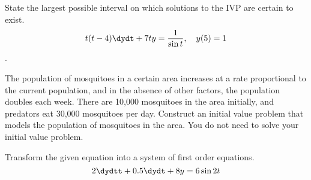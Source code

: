 \documentclass[12pt]{exam}
\begin{document}
\begin{questions}
    
    \newpage    
    
    \question[2] %
    State the largest possible interval on which solutions to the IVP are certain to exist. $$t(t-4) \dydt + 7t y = \frac{1}{\sin t}, \quad y(5) = 1$$.
    \vspace{3cm}
    
    \question[3] %
    The population of mosquitoes in a certain area increases at a rate proportional to the current population, and in the absence of other factors, the population doubles each week. There are 10,000 mosquitoes in the area initially, and predators eat 30,000 mosquitoes per day. Construct an initial value problem that models the population of mosquitoes in the area. You do not need to solve your initial value problem. 
    
    \vspace{3cm}    
    \question[3] %
    Transform the given equation into a system of first order equations. 
    $$2\dydtt + 0.5 \dydt +8y = 6\sin 2t$$
    
    \vspace{3cm}
    



\end{questions}
\end{document}
